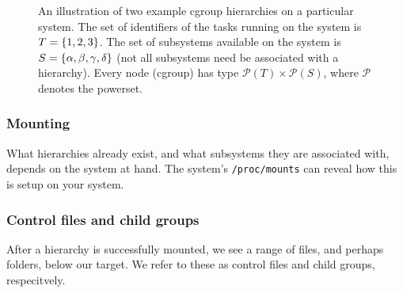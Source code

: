 \begin{figure}[h!]

\centering


\caption[]{An illustration of two example cgroup hierarchies on a particular
system. The set of identifiers of the tasks running on the system is
$T=\left\{{1,2,3}\right\}$. The set of subsystems available on the system is
$S=\left\{{\alpha,\beta,\gamma,\delta}\right\}$ (not all subsystems need be associated
with a hierarchy). Every node (cgroup) has type
$\mathcal{P}(T)\times\mathcal{P}(S)$, where $\mathcal{P}$ denotes the
powerset.}

\label{figure:hierarchy-example}

\end{figure}

\subsubsection{Mounting}

What hierarchies already exist, and what subsystems they are associated with,
depends on the system at hand. The system's \texttt{/proc/mounts} can reveal
how this is setup on your system\cite{man-5-proc}.

\subsubsection{Control files and child groups}

After a hierarchy is successfully mounted, we see a range of files, and perhaps
folders, below our target. We refer to these as control files and child groups,
respecitvely.

